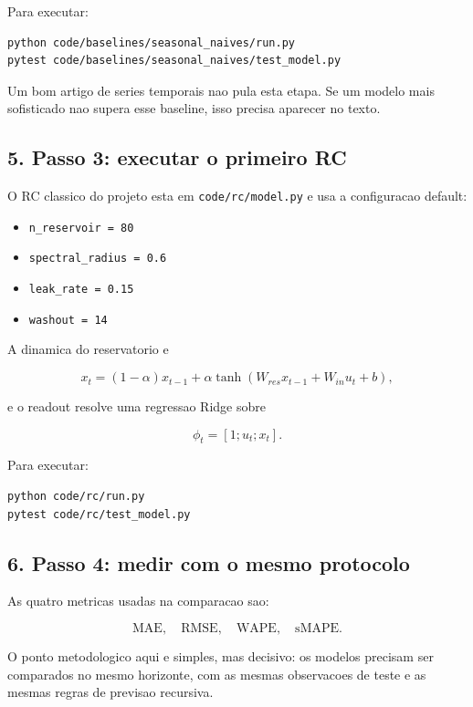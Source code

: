 \documentclass[12pt]{article}
\providecommand{\tightlist}{%
          \setlength{\itemsep}{0pt}\setlength{\parskip}{0pt}}
\begin{document}
Para executar:

\begin{verbatim}
python code/baselines/seasonal_naives/run.py
pytest code/baselines/seasonal_naives/test_model.py
\end{verbatim}

Um bom artigo de series temporais nao pula esta etapa. Se um modelo mais sofisticado nao supera esse baseline, isso precisa aparecer no texto.

\subsection{5. Passo 3: executar o primeiro RC}\label{5-passo-3-executar-o-primeiro-rc}

O RC classico do projeto esta em \texttt{code/rc/model.py} e usa a configuracao default:

\begin{itemize}
\tightlist
\item
  \texttt{n\_reservoir\ =\ 80}
\item
  \texttt{spectral\_radius\ =\ 0.6}
\item
  \texttt{leak\_rate\ =\ 0.15}
\item
  \texttt{washout\ =\ 14}
\end{itemize}

A dinamica do reservatorio e

\[
x_t = (1 - \alpha) x_{t-1} + \alpha \tanh(W_{res} x_{t-1} + W_{in} u_t + b),
\]

e o readout resolve uma regressao Ridge sobre

\[
\phi_t = [1; u_t; x_t].
\]

Para executar:

\begin{verbatim}
python code/rc/run.py
pytest code/rc/test_model.py
\end{verbatim}

\subsection{6. Passo 4: medir com o mesmo protocolo}\label{6-passo-4-medir-com-o-mesmo-protocolo}

As quatro metricas usadas na comparacao sao:

\[
\mathrm{MAE},\quad \mathrm{RMSE},\quad \mathrm{WAPE},\quad \mathrm{sMAPE}.
\]

O ponto metodologico aqui e simples, mas decisivo: os modelos precisam ser comparados no mesmo horizonte, com as mesmas observacoes de teste e as mesmas regras de previsao recursiva.
\end{document}
